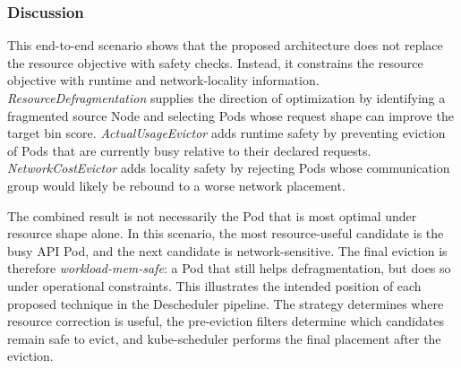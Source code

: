 \subsubsection{Discussion}

This end-to-end scenario shows that the proposed architecture does not replace the resource objective with safety checks. Instead, it constrains the resource objective with runtime and network-locality information. \textit{ResourceDefragmentation} supplies the direction of optimization by identifying a fragmented source Node and selecting Pods whose request shape can improve the target bin score. \textit{ActualUsageEvictor} adds runtime safety by preventing eviction of Pods that are currently busy relative to their declared requests. \textit{NetworkCostEvictor} adds locality safety by rejecting Pods whose communication group would likely be rebound to a worse network placement.

The combined result is not necessarily the Pod that is most optimal under resource shape alone. In this scenario, the most resource-useful candidate is the busy API Pod, and the next candidate is network-sensitive. The final eviction is therefore \textit{workload-mem-safe}: a Pod that still helps defragmentation, but does so under operational constraints. This illustrates the intended position of each proposed technique in the Descheduler pipeline. The strategy determines where resource correction is useful, the pre-eviction filters determine which candidates remain safe to evict, and kube-scheduler performs the final placement after the eviction.
